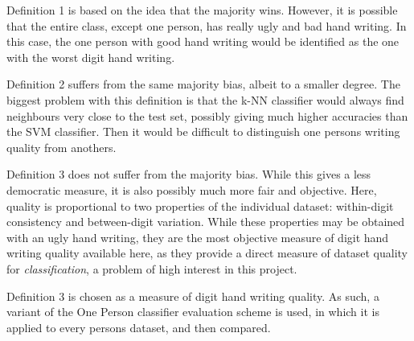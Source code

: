 Definition 1 is based on the idea that the majority wins.
However, it is possible that the entire class, except one person,
has really ugly and bad hand writing. In this case,
the one person with good hand writing would be identified
as the one with the worst digit hand writing.

Definition 2 suffers from the same majority bias,
albeit to a smaller degree. The biggest problem with this
definition is that the k-NN classifier would always find neighbours very
close to the test set, possibly giving much higher
accuracies than the SVM classifier.
Then it would be difficult to distinguish one persons
writing quality from anothers.

Definition 3 does not suffer from the majority bias.
While this gives a less democratic measure,
it is also possibly much more fair and objective.
Here, quality is proportional to two properties of the individual dataset:
within-digit consistency and between-digit variation.
While these properties may be obtained with an ugly hand writing,
they are the most objective measure of digit hand writing quality
available here, as they provide
a direct measure of dataset quality for \textit{classification},
a problem of high interest in this project.

Definition 3 is chosen as a measure of digit hand writing quality.
As such, a variant of the One Person
classifier evaluation scheme is used,
in which it is applied to every persons dataset,
and then compared.